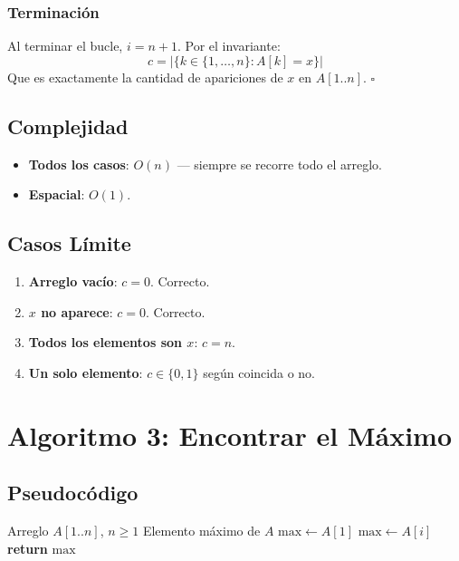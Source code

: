 \documentclass[11pt,a4paper]{article}
\begin{document}
\subsubsection{Terminación}
Al terminar el bucle, $i = n+1$. Por el invariante:
\[
c = |\{k \in \{1, \ldots, n\} : A[k] = x\}|
\]
Que es exactamente la cantidad de apariciones de $x$ en $A[1..n]$. $\square$

\subsection{Complejidad}
\begin{itemize}
    \item \textbf{Todos los casos}: $O(n)$ --- siempre se recorre todo el arreglo.
    \item \textbf{Espacial}: $O(1)$.
\end{itemize}

\subsection{Casos Límite}
\begin{enumerate}
    \item \textbf{Arreglo vacío}: $c = 0$. Correcto.
    \item \textbf{$x$ no aparece}: $c = 0$. Correcto.
    \item \textbf{Todos los elementos son $x$}: $c = n$.
    \item \textbf{Un solo elemento}: $c \in \{0, 1\}$ según coincida o no.
\end{enumerate}

\newpage

\section{Algoritmo 3: Encontrar el Máximo}

\subsection{Pseudocódigo}
\begin{algorithm}[H]
\caption{Encontrar el Máximo}
\begin{algorithmic}[1]
\Require Arreglo $A[1..n]$, $n \geq 1$
\Ensure Elemento máximo de $A$
\State $\text{max} \gets A[1]$
        \State $\text{max} \gets A[i]$
    \EndIf
\EndFor
\State \textbf{return} $\text{max}$
\end{algorithmic}
\end{algorithm}
\end{document}
